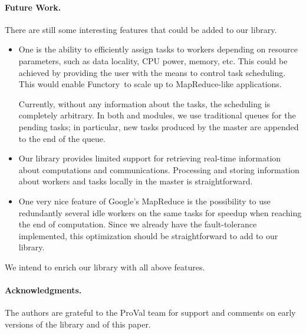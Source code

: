 \documentclass{llncs}
\newcommand{\functory}{\textsf{Functory}}
\begin{document}
\paragraph{Future Work.}
There are still some interesting features that could be added to our
library. 
\begin{itemize}
\item 
  One is the ability to efficiently assign tasks to workers depending
  on resource parameters, such as data locality, CPU power, memory,
  etc. This could be achieved by providing the user with the means to control
  task scheduling.  This would enable \functory\ to scale up to
  MapReduce-like applications.

  Currently, without any information about the tasks, the scheduling
  is completely arbitrary. In both  and 
  modules, we use traditional queues for the pending tasks; in
  particular, new tasks produced by the master are appended to the end
  of the queue.

\item
  Our library provides limited support for retrieving real-time
  information about computations and communications. Processing and storing
  information about workers and tasks locally in the master is
  straightforward.
 
\item 
  One very nice feature of Google's MapReduce is the possibility to
  use redundantly several idle workers on the same tasks
  for speedup when reaching the end of computation.
  Since we already have the fault-tolerance implemented, this
  optimization should be straightforward to add to our library.
\end{itemize}
We intend to enrich our library with all above features.


\paragraph{Acknowledgments.}
The authors are grateful to the ProVal team for support and comments
on early versions of the library and of this paper.



\end{document}
